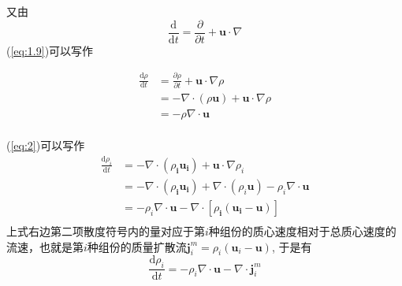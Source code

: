 \documentclass[10pt,aspectratio=43,mathserif,table]{ctexbeamer}
\newcommand{\customref}[1]{(\ref{#1})}
\begin{document}
\begin{frame}
    \small
    又由
    \begin{equation}\label{eq:1.8}
        \frac{\mathrm{d}}{\mathrm{d}t}=\frac{\partial}{\partial t}+\mathbf{u}\cdot \nabla
    \end{equation}
    \customref{eq:1.9}可以写作

    $$
    \begin{aligned}
        \frac{\mathrm{d}\rho}{\mathrm{d}t}&=\frac{\partial \rho}{\partial t}+\mathbf{u}\cdot \nabla \rho\\
        &=-\nabla \cdot \left( \rho \mathbf{u} \right) +\mathbf{u}\cdot \nabla \rho\\
        &=-\rho \nabla \cdot \mathbf{u}\\
    \end{aligned}
    $$

    \customref{eq:2}可以写作
    $$
    \begin{aligned}
        \frac{\mathrm{d}\rho _i}{\mathrm{d}t}&=-\nabla \cdot \left( \rho _{\boldsymbol{i}}\mathbf{u}_{\boldsymbol{i}} \right) +\mathbf{u}\cdot \nabla \rho _i\\
        &=-\nabla \cdot \left( \rho _{\boldsymbol{i}}\mathbf{u}_{\boldsymbol{i}} \right) +\nabla \cdot \left( \rho _i\mathbf{u} \right) -\rho _i\nabla \cdot \mathbf{u}\\
        &=-\rho _i\nabla \cdot \mathbf{u}-\nabla \cdot \left[ \rho _{\boldsymbol{i}}\left( \mathbf{u}_{\boldsymbol{i}}-\mathbf{u} \right) \right]\\
    \end{aligned}
    $$
    上式右边第二项散度符号内的量对应于第$i$种组份的质心速度相对于总质心速度的流速，也就是第$i$种组份的质量扩散流$\mathbf{j}_{i}^{m}=\rho _i\left( \mathbf{u}_i-\mathbf{u} \right) $, 于是有
    \begin{equation}\label{eq:3}
        \frac{\mathrm{d}\rho _i}{\mathrm{d}t}=-\rho _i\nabla \cdot \mathbf{u}-\nabla \cdot \mathbf{j}_{i}^{m}
    \end{equation}

\end{frame}
\end{document}

